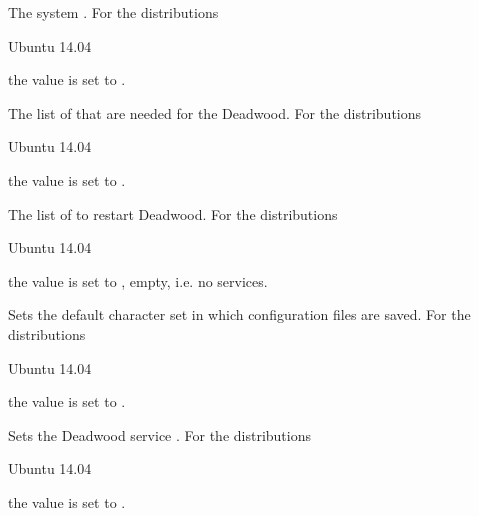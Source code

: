 The system . 
For the distributions
\begin{inparaitem}
\item[\TheDistribution{ubuntu}] Ubuntu 14.04
\end{inparaitem}
the value is set to .


The list of  that are needed for the Deadwood.
For the distributions
\begin{inparaitem}
\item[\TheDistribution{ubuntu}] Ubuntu 14.04
\end{inparaitem}
the value is set to .


The list of  to restart Deadwood.
For the distributions
\begin{inparaitem}
\item[\TheDistribution{ubuntu}] Ubuntu 14.04
\end{inparaitem}
the value is set to \qcode{}, empty, i.e. no services.


Sets the default character set  in which configuration files are 
saved. For the distributions
\begin{inparaitem}
\item[\TheDistribution{ubuntu}] Ubuntu 14.04
\end{inparaitem}
the value is set to .


Sets the Deadwood service .
For the distributions
\begin{inparaitem}
\item[\TheDistribution{ubuntu}] Ubuntu 14.04
\end{inparaitem}
the value is set to .


